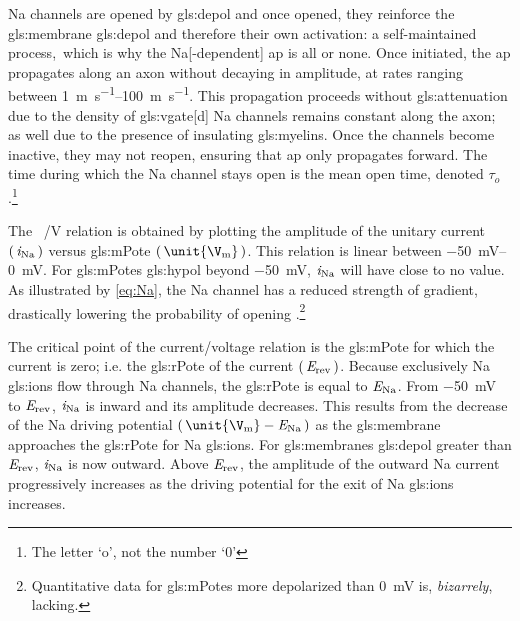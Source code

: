 \documentclass[class={myRUCProject}, crop=false]{standalone}
\begin{document}
{}\gls{Na} channels are opened by \gls{gls:depol} and once opened, they reinforce the \gls{gls:membrane} \gls{gls:depol} and therefore their own activation: a self-maintained process,\footnotemark~which is why the \gls{Na}[-dependent] \gls{ap} is all or none.
Once initiated, the \gls{ap} propagates along an axon without decaying in amplitude, at rates ranging between \qtyrange{1}{100}{\meter\per\s}. 
This propagation proceeds without \gls{gls:attenuation} due to the density of \gls{gls:vgate}[d] \gls{Na} channels remains constant along the axon; as well due to the presence of insulating \glspl{gls:myelin}. 
Once the channels become inactive, they may not reopen, ensuring that \gls{ap} only propagates forward. 
The time during which the \gls{Na} channel stays open is the mean open time, denoted \(\tau_o\) \cite{Hammond2015ch4}.\footnote{The letter  `o', not the number `0'}

The \unit[per-mode = symbol]{\ucur\sodium\per\V} relation is obtained by plotting the amplitude of the unitary current \(\left(\,\mathit{i}_\mathrm{Na}\,\right)\) versus \gls{gls:mPote} \(\br{\unit{\V\membrane}}\). This relation is linear between \qtyrange{-50}{0}{\mV}. For \glspl{gls:mPote} \gls{gls:hypol} beyond \qty{-50}{\mV}, \(\mathit{i}_\mathrm{Na}\) will have close to no value. As illustrated by \cref{eq:Na}, the \gls{Na} channel has a reduced strength of gradient, drastically lowering the probability of opening \cite{Hammond2015ch4}.\footnote{Quantitative data for \glspl{gls:mPote} more depolarized than \qty{0}{\mV} is, \emph{bizarrely}, lacking.}

The critical point of the current/voltage relation is the \gls{gls:mPote} for which the current is zero; i.e. the \gls{gls:rPote} of the current \(\left(\,\mathit{E}_\mathrm{rev}\,\right)\). 
Because exclusively \gls{Na} \glspl{gls:ion} flow through \gls{Na} channels, the \gls{gls:rPote} is equal to \(\mathit{E}_\mathrm{Na}\). 
From \qty{-50}{\mV} to \(\mathit{E}_\mathrm{rev}\), \(\mathit{i}_\mathrm{Na}\) is inward and its amplitude decreases. This results from the decrease of the \gls{Na} driving potential \(\br{\unit{\V\membrane}-\equi\sodium}\) as the \gls{gls:membrane} approaches the \gls{gls:rPote} for \gls{Na} \glspl{gls:ion}. 
For \glspl{gls:membrane} \gls{gls:depol} greater than \(\mathit{E}_\mathrm{rev}\), \(\mathit{i}_\mathrm{Na}\) is now outward. Above \(\mathit{E}_\mathrm{rev}\), the amplitude of the outward \gls{Na} current progressively increases as the driving potential for the exit of \gls{Na} \glspl{gls:ion} increases. 
\end{document}
